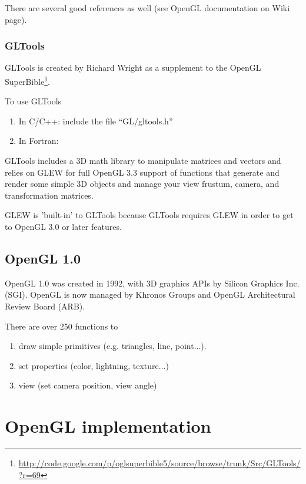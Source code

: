 There are several good references as well (see OpenGL
documentation on Wiki page). 

\subsubsection{GLTools}
\label{sec:gltools}

GLTools is created by Richard Wright as a supplement to the OpenGL
SuperBible\footnote{\url{http://code.google.com/p/oglsuperbible5/source/browse/trunk/Src/GLTools/?r=69}}. 

To use GLTools
\begin{enumerate}
\item In C/C++: include the file ``GL/gltools.h''
\item In Fortran: 

\end{enumerate}

GLTools includes a 3D math library to manipulate matrices and vectors
and relies on GLEW for full OpenGL 3.3 support of functions that
generate and render some simple 3D objects and manage your view
frustum, camera, and transformation matrices.

GLEW is 'built-in' to GLTools because GLTools requires GLEW in order
to get to OpenGL 3.0 or later features.


\subsection{OpenGL 1.0}


OpenGL 1.0 was created in 1992, with 3D graphics APIs by Silicon
Graphics Inc. (SGI). OpenGL is now managed by Khronos Groups and
OpenGL Architectural Review Board (ARB).

There are over 250 functions to 
\begin{enumerate}
\item draw simple primitives
  (e.g. triangles, line, point...). 
\item set properties (color, lightning, texture...)
\item view (set camera position, view angle)
\end{enumerate}



\section{OpenGL implementation}
\label{sec:OpenGL_implementation}

